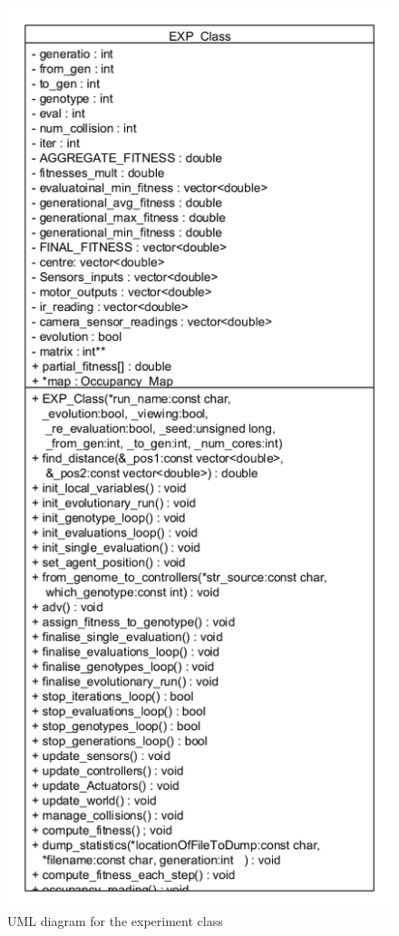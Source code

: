 \begin{figure}[h]
\centering
\includegraphics[scale=0.6]{Chapter2/images/exp_class_uml.png}
\caption{UML diagram for the experiment class}
\label{fig:exp_uml}
\end{figure}


